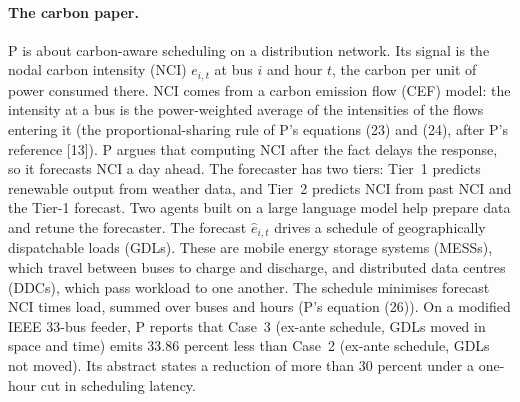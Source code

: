 \documentclass{article}
\begin{document}
\paragraph{The carbon paper.}
P \cite{P} is about carbon-aware scheduling on a distribution network.
Its signal is the nodal carbon intensity (NCI) \(e_{i,t}\) at bus \(i\) and hour \(t\), the carbon per unit of power consumed there.
NCI comes from a carbon emission flow (CEF) model: the intensity at a bus is the power-weighted average of the intensities of the flows entering it (the proportional-sharing rule of P's equations (23) and (24), after P's reference [13]).
P argues that computing NCI after the fact delays the response, so it forecasts NCI a day ahead.
The forecaster has two tiers: Tier~1 predicts renewable output from weather data, and Tier~2 predicts NCI from past NCI and the Tier-1 forecast.
Two agents built on a large language model help prepare data and retune the forecaster.
The forecast \(\hat e_{i,t}\) drives a schedule of geographically dispatchable loads (GDLs).
These are mobile energy storage systems (MESSs), which travel between buses to charge and discharge, and distributed data centres (DDCs), which pass workload to one another.
The schedule minimises forecast NCI times load, summed over buses and hours (P's equation (26)).
On a modified IEEE 33-bus feeder, P reports that Case~3 (ex-ante schedule, GDLs moved in space and time) emits 33.86 percent less than Case~2 (ex-ante schedule, GDLs not moved).
Its abstract states a reduction of more than 30 percent under a one-hour cut in scheduling latency.
\end{document}
